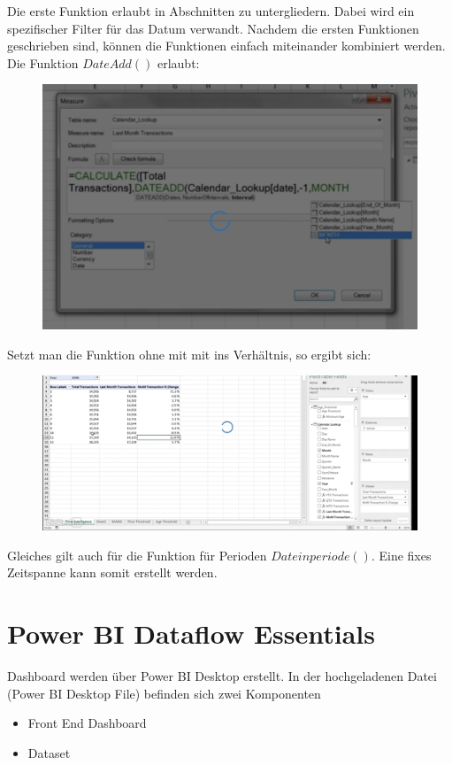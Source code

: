 Die erste Funktion erlaubt in Abschnitten zu untergliedern. Dabei wird ein spezifischer Filter für das Datum verwandt. 
Nachdem die ersten Funktionen geschrieben sind, können die Funktionen einfach miteinander kombiniert werden. Die Funktion $DateAdd()$ erlaubt:

\begin{figure}[H]
	\centering
	\includegraphics[scale = 0.3]{attachment/chapter_1/screenshot114}
	\caption{}
	\label{fig:screenshot114}
\end{figure} 
Setzt man die Funktion ohne mit mit ins Verhältnis, so ergibt sich:

\begin{figure}[H]
	\centering
	\includegraphics[scale = 0.3]{attachment/chapter_1/screenshot113}
	\caption{}
	\label{fig:screenshot113}
\end{figure} 
Gleiches gilt auch für die Funktion für Perioden $Dateinperiode()$. Eine fixes Zeitspanne kann somit erstellt werden. 

\section{Power BI Dataflow Essentials}
Dashboard werden über Power BI Desktop erstellt. In der hochgeladenen Datei (Power BI Desktop File) befinden sich zwei Komponenten
\begin{itemize}
	\item Front End Dashboard
	\item Dataset
\end{itemize}


